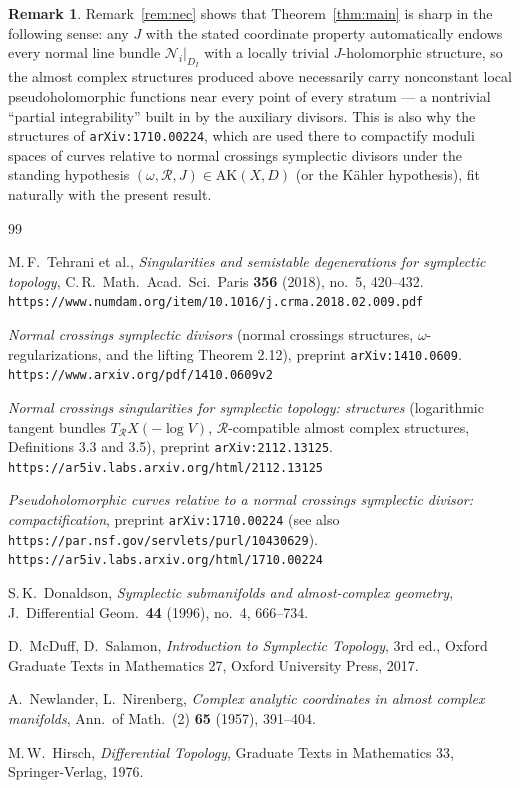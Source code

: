 \documentclass[11pt]{amsart}
\theoremstyle{plain}
\theoremstyle{definition}
\newtheorem{remark}[theorem]{Remark}
\newcommand{\AK}{\mathrm{AK}}
\newcommand{\NN}{\mathcal{N}}
\begin{document}
\begin{remark}
Remark~\ref{rem:nec} shows that Theorem~\ref{thm:main} is sharp in the
following sense: any $J$ with the stated coordinate property automatically
endows every normal line bundle $\NN_i|_{D_I}$ with a locally trivial
$J$-holomorphic structure, so the almost complex structures produced above
necessarily carry nonconstant local pseudoholomorphic functions near every
point of every stratum — a nontrivial ``partial integrability'' built in by
the auxiliary divisors. This is also why the structures of
\texttt{arXiv:1710.00224}, which are used there to compactify moduli spaces
of curves relative to normal crossings symplectic divisors under the
standing hypothesis $(\omega,\mathcal R,J)\in\AK(X,D)$ (or the K\"ahler
hypothesis), fit naturally with the present result.
\end{remark}

\begin{thebibliography}{99}

 M.\,F.\ Tehrani et al., \emph{Singularities and semistable
degenerations for symplectic topology}, C.\,R.\ Math.\ Acad.\ Sci.\ Paris
\textbf{356} (2018), no.\ 5, 420--432.
\texttt{https://www.numdam.org/item/10.1016/j.crma.2018.02.009.pdf}

 \emph{Normal crossings symplectic divisors} (normal crossings
structures, $\omega$-regularizations, and the lifting Theorem 2.12), preprint
\texttt{arXiv:1410.0609}.
\texttt{https://www.arxiv.org/pdf/1410.0609v2}

 \emph{Normal crossings singularities for symplectic topology:
structures} (logarithmic tangent bundles $T_{\mathcal R}X(-\log V)$,
$\mathcal R$-compatible almost complex structures, Definitions 3.3 and 3.5),
preprint \texttt{arXiv:2112.13125}.
\texttt{https://ar5iv.labs.arxiv.org/html/2112.13125}

 \emph{Pseudoholomorphic curves relative to a normal
crossings symplectic divisor: compactification}, preprint
\texttt{arXiv:1710.00224} (see also
\texttt{https://par.nsf.gov/servlets/purl/10430629}).
\texttt{https://ar5iv.labs.arxiv.org/html/1710.00224}

 S.\,K.\ Donaldson, \emph{Symplectic submanifolds and
almost-complex geometry}, J.\ Differential Geom.\ \textbf{44} (1996),
no.\ 4, 666--734.

 D.\ McDuff, D.\ Salamon, \emph{Introduction to Symplectic
Topology}, 3rd ed., Oxford Graduate Texts in Mathematics 27, Oxford
University Press, 2017.

 A.\ Newlander, L.\ Nirenberg, \emph{Complex analytic coordinates
in almost complex manifolds}, Ann.\ of Math.\ (2) \textbf{65} (1957),
391--404.

 M.\,W.\ Hirsch, \emph{Differential Topology}, Graduate Texts
in Mathematics 33, Springer-Verlag, 1976.

\end{thebibliography}
\end{document}
